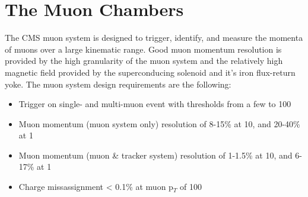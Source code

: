 \section{The Muon Chambers}
The CMS muon system is designed to trigger, identify, and measure the
momenta of muons over a large kinematic range. Good muon momentum
resolution is provided by the high granularity of the muon system and
the relatively high magnetic field provided by the superconducing
solenoid and it's iron flux-return yoke. The muon system design
requirements are the following:
\begin{itemize}
\item Trigger on single- and multi-muon event with thresholds from a
  few to 100\GeV
\item Muon momentum (muon system only) resolution of 8-15\% at 10\GeV,
  and 20-40\% at 1\TeV
\item Muon momentum (muon \& tracker system) resolution of 1-1.5\% at
  10\GeV, and 6-17\% at 1\TeV
\item Charge missassignment < 0.1\% at muon p$_{T}$ of 100\GeV
\end{itemize}

